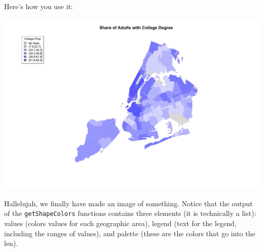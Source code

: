 \documentclass[
  openany]{book}
\newenvironment{Shaded}{\begin{snugshade}}{\end{snugshade}}
\newcommand{\AttributeTok}[1]{\textcolor[rgb]{0.77,0.63,0.00}{#1}}
\newcommand{\DecValTok}[1]{\textcolor[rgb]{0.00,0.00,0.81}{#1}}
\newcommand{\FloatTok}[1]{\textcolor[rgb]{0.00,0.00,0.81}{#1}}
\newcommand{\FunctionTok}[1]{\textcolor[rgb]{0.00,0.00,0.00}{#1}}
\newcommand{\NormalTok}[1]{#1}
\newcommand{\OtherTok}[1]{\textcolor[rgb]{0.56,0.35,0.01}{#1}}
\newcommand{\SpecialCharTok}[1]{\textcolor[rgb]{0.00,0.00,0.00}{#1}}
\newcommand{\StringTok}[1]{\textcolor[rgb]{0.31,0.60,0.02}{#1}}
\begin{document}
Here's how you use it:

\begin{Shaded}
\end{Shaded}

\begin{center}\includegraphics[width=0.9\linewidth]{carpedatum_files/figure-html/unnamed-chunk-89-1} \end{center}

Hallelujah, we finally have made an image of something. Notice that the output of the \texttt{getShapeColors} functions contains three elements (it is technically a list): values (colors values for each geographic area), legend (text for the legend, including the ranges of values), and palette (these are the colors that go into the len).
\end{document}
